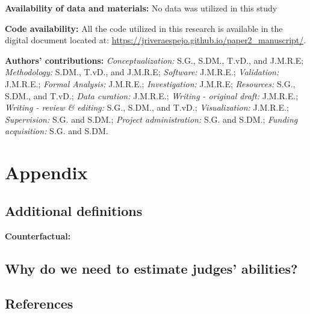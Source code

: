 \documentclass[
  authoryear,
  preprint,
  1p]{elsarticle}
\begin{document}
\textbf{Availability of data and materials:} No data was utilized in
this study

\textbf{Code availability:} All the code utilized in this research is
available in the digital document located at:
\url{https://jriveraespejo.github.io/paper2_manuscript/}.

\textbf{Authors' contributions:} \emph{Conceptualization:} S.G., S.DM.,
T.vD., and J.M.R.E; \emph{Methodology:} S.DM., T.vD., and J.M.R.E;
\emph{Software:} J.M.R.E.; \emph{Validation:} J.M.R.E.; \emph{Formal
Analysis:} J.M.R.E.; \emph{Investigation:} J.M.R.E; \emph{Resources:}
S.G., S.DM., and T.vD.; \emph{Data curation:} J.M.R.E.; \emph{Writing -
original draft:} J.M.R.E.; \emph{Writing - review \& editing:} S.G.,
S.DM., and T.vD.; \emph{Visualization:} J.M.R.E.; \emph{Supervision:}
S.G. and S.DM.; \emph{Project administration:} S.G. and S.DM.;
\emph{Funding acquisition:} S.G. and S.DM.

\newpage{}

\section{Appendix}\label{sec-appendix}

\subsection{Additional definitions}\label{sec-appA}

\textbf{Counterfactual:}

\subsection{Why do we need to estimate judges'
abilities?}\label{sec-appB}

\newpage{}

\subsection*{References}\label{references}

\renewcommand{\bibsection}{}

\end{document}
